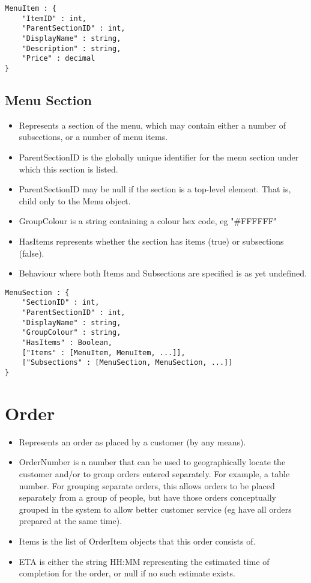 \documentclass[12pt, a4paper]{article}
\begin{document}
\begin{verbatim}
MenuItem : {
	"ItemID" : int,
	"ParentSectionID" : int,
	"DisplayName" : string,
	"Description" : string,
	"Price" : decimal
}
\end{verbatim}


\subsection{Menu Section}\label{subsec:MenuSection}

\begin{itemize}
\item Represents a section of the menu, which may contain either a number of subsections, or a number of menu items.
\item ParentSectionID is the globally unique identifier for the menu section under which this section is listed.
\item ParentSectionID may be null if the section is a top-level element. That is, child only to the Menu object.
\item GroupColour is a string containing a colour hex code, eg "\#FFFFFF"
\item HasItems represents whether the section has items (true) or subsections (false).
\item Behaviour where both Items and Subsections are specified is as yet undefined. 
\end{itemize}

\begin{verbatim}
MenuSection : {
	"SectionID" : int,
	"ParentSectionID" : int,
	"DisplayName" : string,
	"GroupColour" : string,
	"HasItems" : Boolean,
	["Items" : [MenuItem, MenuItem, ...]],
	["Subsections" : [MenuSection, MenuSection, ...]]
}
\end{verbatim}


\pagebreak
\section{Order}

\begin{itemize}
\item Represents an order as placed by a customer (by any means).
\item OrderNumber is a number that can be used to geographically locate the customer and/or to group orders entered separately. For example, a table number.
For grouping separate orders, this allows orders to be placed separately from a group of people, but have those orders conceptually grouped in the system to allow better customer service (eg have all orders prepared at the same time).
\item Items is the list of OrderItem objects that this order consists of.
\item ETA is either the string HH:MM representing the estimated time of completion for the order, or null if no such estimate exists.
\end{itemize}
\end{document}
